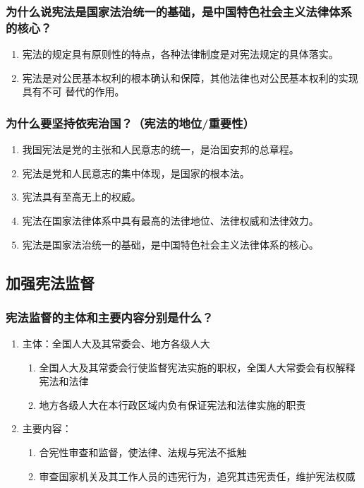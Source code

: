 \documentclass[11pt]{article}
\begin{document}
\subsubsection{为什么说宪法是国家法治统一的基础，是中国特色社会主义法律体系的核心？}
\label{sec:org4a1c548}
\begin{enumerate}
\item 宪法的规定具有原则性的特点，各种法律制度是对宪法规定的具体落实。
\item 宪法是对公民基本权利的根本确认和保障，其他法律也对公民基本权利的实现具有不可
替代的作用。
\end{enumerate}
\subsubsection{为什么要坚持依宪治国？（宪法的地位/重要性）}
\label{sec:org6fd92ce}
\begin{enumerate}
\item 我国宪法是党的主张和人民意志的统一，是治国安邦的总章程。
\item 宪法是党和人民意志的集中体现，是国家的根本法。
\item 宪法具有至高无上的权威。
\item 宪法在国家法律体系中具有最高的法律地位、法律权威和法律效力。
\item 宪法是国家法治统一的基础，是中国特色社会主义法律体系的核心。
\end{enumerate}
\subsection{加强宪法监督}
\label{sec:orgff32e0a}
\subsubsection{宪法监督的主体和主要内容分别是什么？}
\label{sec:org0d54179}
\begin{enumerate}
\item 主体：全国人大及其常委会、地方各级人大
\begin{enumerate}
\item 全国人大及其常委会行使监督宪法实施的职权，全国人大常委会有权解释宪法和法律
\item 地方各级人大在本行政区域内负有保证宪法和法律实施的职责
\end{enumerate}
\item 主要内容：
\begin{enumerate}
\item 合宪性审查和监督，使法律、法规与宪法不抵触
\item 审查国家机关及其工作人员的违宪行为，追究其违宪责任，维护宪法权威
\end{enumerate}
\end{enumerate}
\end{document}

